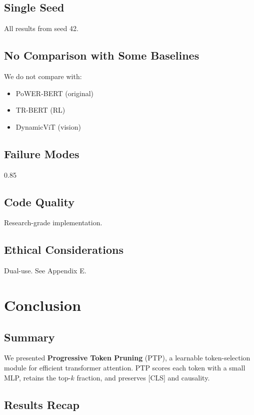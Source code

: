 {\subsection{Single Seed}

All results from seed 42.

\subsection{No Comparison with Some Baselines}

We do not compare with:
\begin{itemize}
\item PoWER-BERT (original)
\item TR-BERT (RL)
\item DynamicViT (vision)

\end{itemize}
\subsection{Failure Modes}

0.85

\subsection{Code Quality}

Research-grade implementation.

\subsection{Ethical Considerations}

Dual-use. See Appendix E.




\section{Conclusion}

\subsection{Summary}

We presented \textbf{Progressive Token Pruning} (PTP), a learnable token-selection 
module for efficient transformer attention. PTP scores each token with a 
small MLP, retains the top-$k$ fraction, and preserves [CLS] and causality.

\subsection{Results Recap}

}
